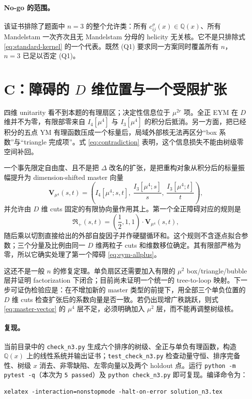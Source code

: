 \documentclass[11pt,a4paper,UTF8]{ctexart}
\begin{document}
\paragraph{No-go 的范围。}
该证书排除了题面中 $n=3$ 的整个允许类：所有 $c_{ij}^{\sigma}(x)\in\mathbb Q(x)$、所有 Mandelstam 一次齐次且无 Mandelstam 分母的 helicity 无关核。它不是只排除式 \eqref{eq:standard-kernel} 的一个代表。既然 (Q1) 要求同一方案同时覆盖所有 $n$，$n=3$ 已足以否定 (Q1)。

\section{C：障碍的 $D$ 维位置与一个受限扩张}

四维 unitarity 看不到本题的有理扇区；决定性信息位于
$\mu^{2r}$ 项。全正 EYM 在 $D$ 维并不为零，有限部零来自
$I_4[\mu^4]$ 与 $I_3[\mu^4]$ 的积分后抵消。另一方面，把已经积分的五点 YM 有理函数压成一个标量后，局域外部核无法再区分“box 系数”与“triangle 完成项”。式 \eqref{eq:contradiction} 表明，这个信息损失不能由树级零空间补回。

一个事先限定自由度、且不是把 $\Delta$ 改名的扩张，是把重构对象从积分后的标量振幅提升为 dimension-shifted master 向量
\begin{equation}
\bm{V}_{\mu^4}(s,t)=\left(
I_4[\mu^4;s,t],\ \frac{I_3[\mu^4;s]}s,\
\frac{I_3[\mu^4;t]}t\right),
\label{eq:master-vector}
\end{equation}
并允许由 $D$ 维 cuts 固定的有限协向量作用其上。第一个全正障碍对应的规则是
\begin{equation}
\mathfrak R_{+}(s,t)
=\left(\frac12,1,1\right)\!\cdot\bm{V}_{\mu^4}(s,t),
\label{eq:completion-rule}
\end{equation}
随后乘以切割直接给出的外部自旋因子并作硬腿循环和。这个规则不含逐点拟合参数；三个分量及比例由同一 $D$ 维两粒子 cuts 和维数移位确定。其有限部严格为零，所以它确实处理了第一个障碍 \eqref{eq:eym-allplus}。

这还不是一般 $n$ 的修复定理。单负扇区还需要加入有限的
$\mu^2$ box/triangle/bubble 层并证明 factorization 下闭合；目前尚未证明一个统一的 tree-to-loop 映射。下一步可证伪检验应是：在不增加新的 master 类型的前提下，用全部三个单负位置的 $D$ 维 cuts 检查扩张后的系数向量是否一致。若仍出现增广秩跳跃，则式 \eqref{eq:master-vector} 的 $\mu^4$ 层不足，必须明确加入 $\mu^2$ 层，而不能再调整树级核。

\paragraph{复现。}
当前目录中的 \texttt{check\_n3.py} 生成六个排序的树级、全正与单负有理函数，构造 $\mathbb Q(x)$ 上的线性系统并输出证书；\texttt{test\_check\_n3.py} 检查动量守恒、排序完备性、树级 $x$ 消去、非零缺陷、左零向量以及两个 holdout 点。运行 \texttt{python -m pytest -q}（本次为 \texttt{5 passed}）及 \texttt{python check\_n3.py} 即可复现。编译命令为：
\begin{center}
\small\texttt{xelatex -interaction=nonstopmode -halt-on-error solution\_n3.tex}
\end{center}
\end{document}
